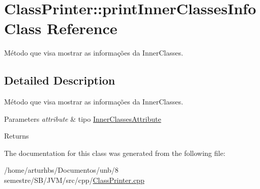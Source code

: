 \hypertarget{classClassPrinter_1_1printInnerClassesInfo}{}\section{Class\+Printer\+:\+:print\+Inner\+Classes\+Info Class Reference}
\label{classClassPrinter_1_1printInnerClassesInfo}


Método que visa mostrar as informações da Inner\+Classes.  




\subsection{Detailed Description}
Método que visa mostrar as informações da Inner\+Classes. 


\begin{DoxyParams}{Parameters}
{\em attribute} & tipo \hyperlink{classInnerClassesAttribute}{Inner\+Classes\+Attribute} \\
\hline
\end{DoxyParams}
\begin{DoxyReturn}{Returns}

\end{DoxyReturn}


The documentation for this class was generated from the following file\+:\begin{DoxyCompactItemize}
\item 
/home/arturhbs/\+Documentos/unb/8 semestre/\+S\+B/\+J\+V\+M/src/cpp/\hyperlink{ClassPrinter_8cpp}{Class\+Printer.\+cpp}\end{DoxyCompactItemize}
